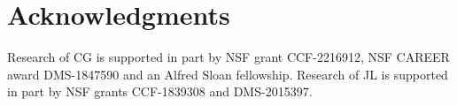 
\section*{Acknowledgments}

Research of CG is supported in part by NSF grant CCF-2216912, NSF CAREER award DMS-1847590 and an Alfred Sloan fellowship. Research of JL is supported in part by NSF grants CCF-1839308 and DMS-2015397.
